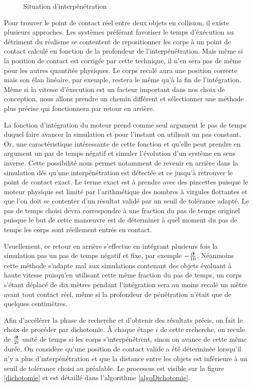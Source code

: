 \begin{figure}
  \centering
  
  \caption{Situation d'interpénétration}
\end{figure}

Pour trouver le point de contact réel entre deux objets en collision,
il existe plusieurs approches. Les systèmes préférant favoriser le
temps d'éxécution au détriment du réalisme se contentent de
repositionner les corps à un point de contact calculé en fonction de
la profondeur de l'interpénétration. Mais même si la position de
contact est corrigée par cette technique, il n'en sera pas de même
pour les autres quantités physiques. Le corps recalé aura une position
correcte mais son élan linéaire, par exemple, restera le même qu'à la
fin de l'intégration.  Même si la vitesse d'éxecution est un facteur
important dans nos choix de conception, nous allons prendre un chemin
différent et sélectionner une méthode plus précise qui fonctionnera
par retour en arrière.

La fonction d'intégration du moteur prend comme seul argument le pas
de temps duquel faire avancer la simulation et pour l'instant on
utilisait un pas constant. Or, une caractéristique intéressante de
cette fonction et qu'elle peut prendre en argument un pas de temps
négatif et simuler l'évolution d'un système en sens inverse. Cette
possibilité nous permet notamment de revenir en arrière dans la
simulation dés qu'une interpénétration est détectée et ce jusqu'à
retrouver le point de contact exact. Le terme \og exact \fg{} est à
prendre avec des pincettes puisque le moteur physique est limité par
l'arithmétique des nombres à virgules flottantes et que l'on doit se
contenter d'un résultat validé par un seuil de tolérance adapté. Le
pas de temps choisi devra correspondre à une fraction du pas de temps
originel puisque le but de cette man\oe uvre est de déterminer à quel
moment du pas de temps les corps sont réellement entrés en contact.

Usuellement, ce retour en arrière s'effectue en intégrant plusieurs
fois la simulation pas un pas de temps négatif et fixe, par exemple
$-\frac{\partial \! t}{10}$. Néanmoins cette méthode s'adapte mal aux
simulations contenant des objets évoluant à haute vitesse puisqu'en
utilisant cette même fraction du pas de temps, un corps s'étant
déplacé de dix mètres pendant l'intégration sera au moins recalé un
mètre avant tout contact réel, même si la profondeur de pénétration
n'était que de quelques centimètres.

Afin d'accélérer la phase de recherche et d'obtenir des résultats
précis, on fait le choix de procéder par dichotomie. \`A chaque étape
$i$ de cette recherche, on recule de $\frac{\partial \! t}{2i}$ unité de
temps si les corps s'interpénétrent, sinon on avance de cette même
durée. On considère qu'une position de contact valide a été déterminée
lorsqu'il n'y a plus d'interpénétration et que la distance entre les
objets est inférieure à un seuil de tolérance choisi au préalable. Le
processus est visible sur la figure \ref{dichotomie} et est détaillé
dans l'algorithme \ref{algoDichotomie}.

